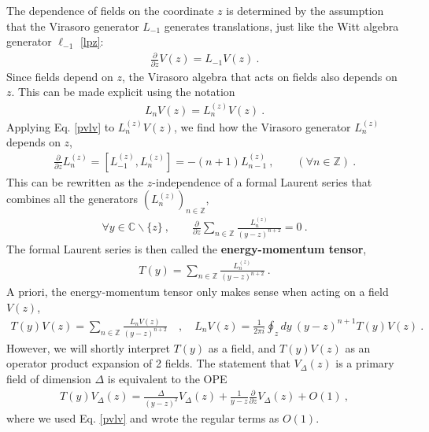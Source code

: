 \documentclass[12pt, a4paper]{article}
\newcommand{\myindex}[1]{\textbf{\boldmath #1}}
\begin{document}
The dependence of fields on the coordinate $z$ is determined by the assumption that the Virasoro generator $L_{-1}$ generates translations, just like the Witt algebra generator $\ell_{-1}$ \eqref{lpz}:
\begin{align}
  \boxed{\frac{\partial}{\partial z} V(z) = L_{-1} V(z)}  \ .
  \label{pvlv}
 \end{align}
 Since fields depend on $z$, the Virasoro algebra that acts on fields also depends on $z$. This can be made explicit using the notation
\begin{align}
   L_n V(z) = L_n^{(z)} V(z) \ . 
\end{align}
Applying Eq. \eqref{pvlv} to $L_n^{(z)} V(z)$, we find how the Virasoro generator $L_n^{(z)}$ depends on $z$,
 \begin{align}
 \frac{\partial}{\partial z} L_n^{(z)} = [L_{-1}^{(z)},L_n^{(z)}]= -(n+1)L_{n-1}^{(z)}\ ,\qquad (\forall n\in\mathbb{Z})\ .
\end{align}
This can be rewritten as the $z$-independence of a formal Laurent series that combines all the generators $(L_n^{(z)})_{n\in\mathbb{Z}}$, 
\begin{align}
 \forall y\in\mathbb{C}\backslash \{z\}\ , \qquad \frac{\partial}{\partial z} \sum_{n\in\mathbb{Z}} \frac{L_n^{(z)}}{(y-z)^{n+2}} = 0\  .
\end{align}
The formal Laurent series is then called the \myindex{energy-momentum tensor}, 
\begin{align}
  \boxed{T(y) = \sum_{n\in\mathbb{Z}} \frac{L_n^{(z)}}{(y-z)^{n+2}}} \ .
  \label{tl}
 \end{align}
 A priori, the energy-momentum tensor only makes sense when acting on a field $V(z)$,
 \begin{align}
 T(y)V(z) = \sum_{n\in\mathbb{Z}} \frac{L_n V(z)}{(y-z)^{n+2}}\quad , \quad L_n V(z) = \frac{1}{2\pi i} \oint_{z}dy\ (y-z)^{n+1} T(y)V(z)\ .
 \label{lvtv}
\end{align}
However, we will shortly interpret $T(y)$ as a field, and $T(y)V(z)$ as an operator product expansion of 2 fields. The statement that $V_\Delta(z)$ is a primary field of dimension $\Delta$ is equivalent to the OPE 
\begin{align}
 \boxed{T(y)V_\Delta(z) = \frac{\Delta}{(y-z)^2} V_\Delta(z) + \frac{1}{y-z} \frac{\partial}{\partial z} V_\Delta(z) + O(1)}\ ,
 \label{tvd}
\end{align}
where we used Eq. \eqref{pvlv} and wrote the regular terms as $O(1)$.
\end{document}
